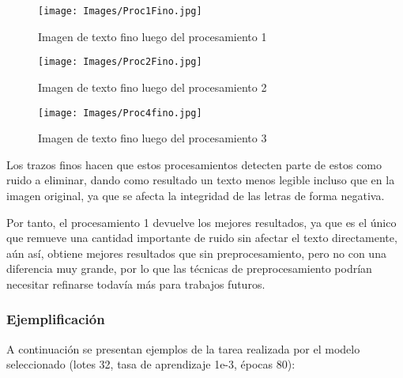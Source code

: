 \documentclass{article}
\begin{document}
\begin{figure}[!h]
    \centering
    \texttt{[image: Images/Proc1Fino.jpg]}
    \caption{Imagen de texto fino luego del procesamiento 1}
    \label{fig:enter-label}
\end{figure}

\begin{figure}[!h]
    \centering
    \texttt{[image: Images/Proc2Fino.jpg]}
    \caption{Imagen de texto fino luego del procesamiento 2}
    \label{fig:enter-label}
\end{figure}

\begin{figure}[!h]
    \centering
    \texttt{[image: Images/Proc4fino.jpg]}
    \caption{Imagen de texto fino luego del procesamiento 3}
    \label{fig:enter-label}
\end{figure}

Los trazos finos hacen que estos procesamientos detecten parte de estos como ruido a eliminar, dando como resultado un texto menos legible incluso que en la imagen original, ya que se afecta la integridad de las letras de forma negativa.

Por tanto, el procesamiento 1 devuelve los mejores resultados, ya que es el único que remueve una cantidad importante de ruido sin afectar el texto directamente, aún así, obtiene mejores resultados que sin preprocesamiento, pero no con una diferencia muy grande, por lo que las técnicas de preprocesamiento podrían necesitar refinarse todavía más para trabajos futuros.

\subsubsection{Ejemplificación}
A continuación se presentan ejemplos de la tarea realizada por el modelo seleccionado (lotes 32, tasa de aprendizaje 1e-3, épocas 80):

\begin{figure}[h]%
    \centering
    \qquad
    \label{fig:example}%
\end{figure}
\begin{figure}[h]%
    \centering
    \qquad
    \label{fig:example}%
\end{figure}
\end{document}
